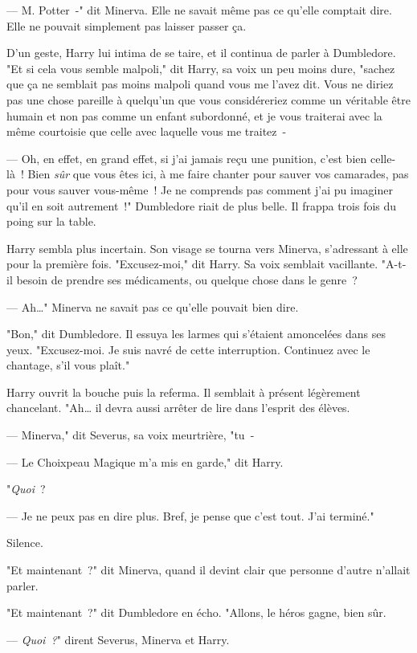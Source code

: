 --- M. Potter~-" dit Minerva. Elle ne savait même pas ce qu'elle comptait dire. Elle ne pouvait simplement pas laisser passer ça.

D'un geste, Harry lui intima de se taire, et il continua de parler à Dumbledore. "Et si cela vous semble malpoli," dit Harry, sa voix un peu moins dure, "sachez que ça ne semblait pas moins malpoli quand vous me l'avez dit. Vous ne diriez pas une chose pareille à quelqu'un que vous considéreriez comme un véritable être humain et non pas comme un enfant subordonné, et je vous traiterai avec la même courtoisie que celle avec laquelle vous me traitez~-

--- Oh, en effet, en grand effet, si j'ai jamais reçu une punition, c'est bien celle-là~! Bien \emph{sûr} que vous êtes ici, à me faire chanter pour sauver vos camarades, pas pour vous sauver vous-même~! Je ne comprends pas comment j'ai pu imaginer qu'il en soit autrement~!" Dumbledore riait de plus belle. Il frappa trois fois du poing sur la table.

Harry sembla plus incertain. Son visage se tourna vers Minerva, s'adressant à elle pour la première fois. "Excusez-moi," dit Harry. Sa voix semblait vacillante. "A-t-il besoin de prendre ses médicaments, ou quelque chose dans le genre~?

--- Ah…" Minerva ne savait pas ce qu'elle pouvait bien dire.

"Bon," dit Dumbledore. Il essuya les larmes qui s'étaient amoncelées dans ses yeux. "Excusez-moi. Je suis navré de cette interruption. Continuez avec le chantage, s'il vous plaît."

Harry ouvrit la bouche puis la referma. Il semblait à présent légèrement chancelant. "Ah… il devra aussi arrêter de lire dans l'esprit des élèves.

--- Minerva," dit Severus, sa voix meurtrière, "tu~-

--- Le Choixpeau Magique m'a mis en garde," dit Harry.

"\emph{Quoi}~?

--- Je ne peux pas en dire plus. Bref, je pense que c'est tout. J'ai terminé."

Silence.

"Et maintenant~?" dit Minerva, quand il devint clair que personne d'autre n'allait parler.

"Et maintenant~?" dit Dumbledore en écho. "Allons, le héros gagne, bien sûr.

--- \emph{Quoi~?}" dirent Severus, Minerva et Harry.

